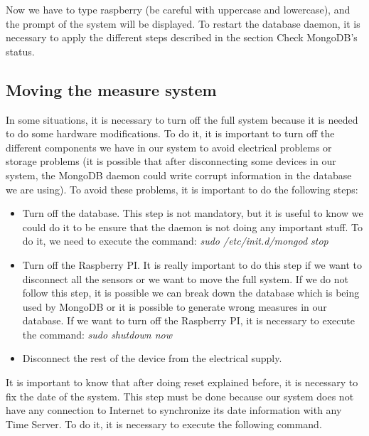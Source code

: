 Now we have to type raspberry (be careful with uppercase and lowercase), and the prompt of the system will be displayed.
To restart the database daemon, it is necessary to apply the different steps described in the section Check MongoDB’s status.

\subsection{Moving the measure system}

In some situations, it is necessary to turn off the full system because it is needed to do some hardware modifications. To do it, it is important to turn off the different components we have in our system to avoid electrical problems or storage problems (it is possible that after disconnecting some devices in our system, the MongoDB daemon could write corrupt information in the database we are using). To avoid these problems, it is important to do the following steps:

\begin{itemize}

\item Turn off the database. This step is not mandatory, but it is useful to know we could do it to be ensure that the daemon is not doing any important stuff. To do it, we need to execute the command:
\textit{sudo /etc/init.d/mongod stop}

\item Turn off the Raspberry PI. It is really important to do this step if we want to disconnect all the sensors or we want to move the full system. If we do not follow this step, it is possible we can break down the database which is being used by MongoDB or it is possible to generate wrong measures in our database. If we want to turn off the Raspberry PI, it is necessary to execute the command:
\textit{sudo shutdown now}

\item Disconnect the rest of the device from the electrical supply.

\end{itemize}

It is important to know that after doing reset explained before, it is necessary to fix the date of the system. This step must be done because our system does not have any connection to Internet to synchronize its date information with any Time Server. To do it, it is necessary to execute the following command.\\

